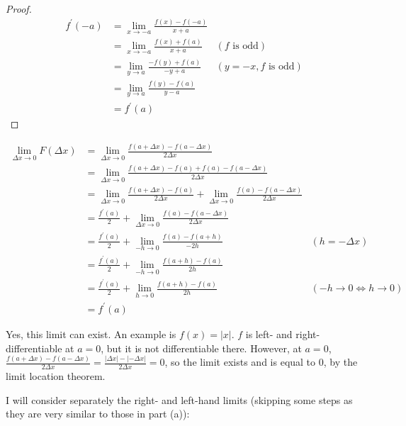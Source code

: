 \begin{proof}
  \begin{align*}
    f^{\prime}(-a) &= \lim_{x \rightarrow -a} \frac{f(x) - f(-a)}{x + a} \\
    &= \lim_{x \rightarrow -a} \frac{f(x) + f(a)}{x + a} & (f\textrm{ is odd}) \\
    &= \lim_{y \rightarrow a} \frac{-f(y) + f(a)}{-y + a} & (y = -x, f\textrm{ is odd}) \\
    &= \lim_{y \rightarrow a} \frac{f(y) - f(a)}{y - a} \\
    &= f^{\prime}(a)
  \end{align*}
\end{proof}

\begin{align*}
  \lim_{\Delta x \rightarrow 0} F(\Delta x) &= \lim_{\Delta x \rightarrow 0} \frac{f(a + \Delta x) - f(a - \Delta x)}{2\Delta x} \\
  &= \lim_{\Delta x \rightarrow 0} \frac{f(a + \Delta x) - f(a) + f(a) - f(a - \Delta x)}{2\Delta x} \\
  &= \lim_{\Delta x \rightarrow 0} \frac{f(a + \Delta x) - f(a)}{2\Delta x} + \lim_{\Delta x \rightarrow 0} \frac{f(a) - f(a - \Delta x)}{2\Delta x} \\
  &= \frac{f^{\prime}(a)}{2} + \lim_{\Delta x \rightarrow 0} \frac{f(a) - f(a - \Delta x)}{2\Delta x} \\
  &= \frac{f^{\prime}(a)}{2} + \lim_{-h \rightarrow 0} \frac{f(a) - f(a + h)}{-2h} & (h = -\Delta x) \\
  &= \frac{f^{\prime}(a)}{2} + \lim_{-h \rightarrow 0} \frac{f(a + h) - f(a)}{2h} \\
  &= \frac{f^{\prime}(a)}{2} + \lim_{h \rightarrow 0} \frac{f(a + h) - f(a)}{2h} & (-h \rightarrow 0 \iff h \rightarrow 0) \\
  &= f^{\prime}(a)
\end{align*}

Yes, this limit can exist. An example is $f(x) = |x|$. $f$ is left- and right-differentiable at $a = 0$, but it is not differentiable there. However, at $a = 0$, $\frac{f(a + \Delta x) - f(a - \Delta x)}{2\Delta x} = \frac{|\Delta x| - |-\Delta x|}{2\Delta x} = 0$, so the limit exists and is equal to 0, by the limit location theorem.

I will consider separately the right- and left-hand limits (skipping some steps as they are very similar to those in part (a)):

